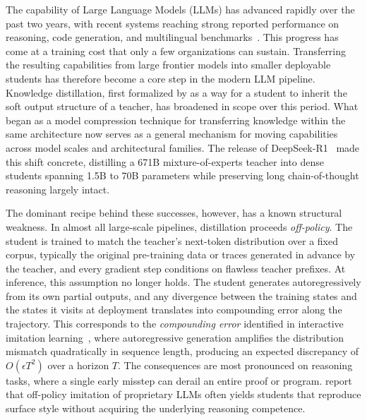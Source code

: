 \documentclass{article} %
\begin{document}
The capability of Large Language Models (LLMs) has advanced rapidly over the past two years, with recent systems reaching strong reported performance on reasoning, code generation, and multilingual benchmarks~\citep{2505.09388,2501.12948,2408.00118}. This progress has come at a training cost that only a few organizations can sustain. Transferring the resulting capabilities from large frontier models into smaller deployable students has therefore become a core step in the modern LLM pipeline. Knowledge distillation, first formalized by \citet{1503.02531} as a way for a student to inherit the soft output structure of a teacher, has broadened in scope over this period. What began as a model compression technique for transferring knowledge within the same architecture now serves as a general mechanism for moving capabilities across model scales and architectural families. The release of DeepSeek-R1~\citep{2501.12948} made this shift concrete, distilling a 671B mixture-of-experts teacher into dense students spanning 1.5B to 70B parameters while preserving long chain-of-thought reasoning largely intact.

The dominant recipe behind these successes, however, has a known structural weakness. In almost all large-scale pipelines, distillation proceeds \emph{off-policy}. The student is trained to match the teacher's next-token distribution over a fixed corpus, typically the original pre-training data or traces generated in advance by the teacher, and every gradient step conditions on flawless teacher prefixes. At inference, this assumption no longer holds. The student generates autoregressively from its own partial outputs, and any divergence between the training states and the states it visits at deployment translates into compounding error along the trajectory. This corresponds to the \emph{compounding error} identified in interactive imitation learning~\citep{1011.0686}, where autoregressive generation amplifies the distribution mismatch quadratically in sequence length, producing an expected discrepancy of $O(\epsilon T^2)$ over a horizon $T$. The consequences are most pronounced on reasoning tasks, where a single early misstep can derail an entire proof or program. \citet{2305.15717} report that off-policy imitation of proprietary LLMs often yields students that reproduce surface style without acquiring the underlying reasoning competence.
\end{document}
